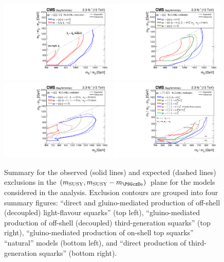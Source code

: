\clearpage
\begin{figure}[thp!]
  \begin{center}
    \includegraphics[width=0.49\textwidth]{mixSUMMARY_transposed_aux}
    \includegraphics[width=0.49\textwidth]{gluinoSUMMARY_transposed_aux} \\
    \includegraphics[width=0.49\textwidth]{naturalWT1SUMMARY_transposed_aux}
    \includegraphics[width=0.49\textwidth]{allThirdGenSUMMARY_transposed_aux} \\
    \caption{Summary for the observed (solid lines) and expected
      (dashed lines) exclusions in the 
      $(m_{\mathrm{SUSY}}, m_{\mathrm{SUSY}} - m_{\PSGczDo})$ plane for
      the models considered in the analysis. Exclusion contours are
      grouped into four summary figures: 
       ``direct and gluino-mediated production of off-shell
       (decoupled) light-flavour squarks'' (top left), 
       ``gluino-mediated production of off-shell (decoupled)
       third-generation squarks'' (top right), ``gluino-mediated
       production of on-shell top squarks'' \ie ``natural'' models
       (bottom left), and ``direct production of third-generation 
       squarks'' (bottom right). 
       \label{fig:summary-excl-plots} }
  \end{center}
\end{figure}


